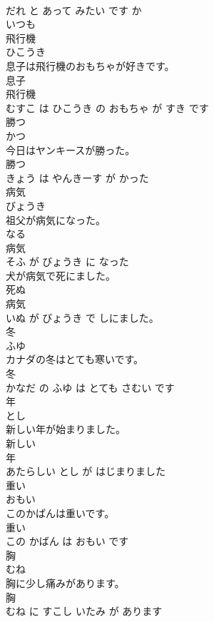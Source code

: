 \documentclass[8pt]{extreport}
\begin{document}
\begin{CJK}{UTF8}{min}
\\	だれ と あって みたい です か			
\\	いつも	
\\	飛行機	
\\	ひこうき			
\\	息子は飛行機のおもちゃが好きです。	
\\	息子 
\\	飛行機 
\\	むすこ は ひこうき の おもちゃ が すき です			
\\	勝つ	
\\	かつ			
\\	今日はヤンキースが勝った。	
\\	勝つ 
\\	きょう は やんきーす が かった			
\\	病気	
\\	びょうき			
\\	祖父が病気になった。	
\\	なる 
\\	病気 
\\	そふ が びょうき に なった			
\\	犬が病気で死にました。	
\\	死ぬ 
\\	病気 
\\	いぬ が びょうき で しにました。			
\\	冬	
\\	ふゆ			
\\	カナダの冬はとても寒いです。	
\\	冬 
\\	かなだ の ふゆ は とても さむい です			
\\	年	
\\	とし			
\\	新しい年が始まりました。	
\\	新しい 
\\	年 
\\	あたらしい とし が はじまりました			
\\	重い	
\\	おもい			
\\	このかばんは重いです。	
\\	重い 
\\	この かばん は おもい です			
\\	胸	
\\	むね			
\\	胸に少し痛みがあります。	
\\	胸 
\\	むね に すこし いたみ が あります			

\end{CJK}
\end{document}
